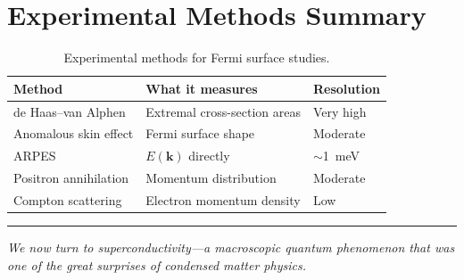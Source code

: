 \section{Experimental Methods Summary}

\begin{table}[H]
\centering
\caption{Experimental methods for Fermi surface studies.}
\label{tab:fs_methods}
\begin{tabular}{@{}lll@{}}
\toprule
Method & What it measures & Resolution \\
\midrule
de Haas--van Alphen  & Extremal cross-section areas & Very high \\
Anomalous skin effect & Fermi surface shape & Moderate \\
ARPES                & $E(\mathbf{k})$ directly & $\sim$\SI{1}{\milli\electronvolt} \\
Positron annihilation & Momentum distribution & Moderate \\
Compton scattering   & Electron momentum density & Low \\
\bottomrule
\end{tabular}
\end{table}

\vspace{1cm}
\noindent\rule{\textwidth}{0.4pt}
\textit{We now turn to superconductivity---a macroscopic quantum phenomenon that was one of the great surprises of condensed matter physics.}
